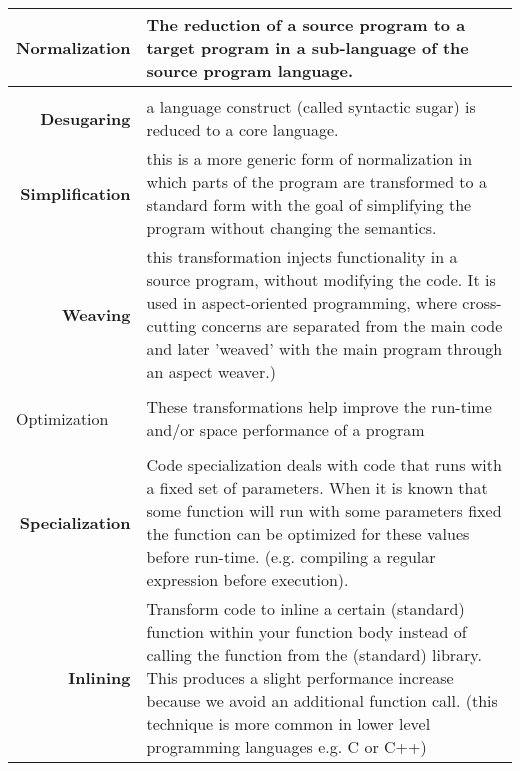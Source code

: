 \begin{longtable}{p{}p{}}
\multicolumn{1}{l}{Normalization} & The reduction of a source program to a target program in a sub-language of the source program language.
\\ \hline \\
\multicolumn{1}{r}{\bf Desugaring}                  & a language construct (called syntactic sugar) is reduced to a core language.                                                    \\
\multicolumn{1}{r}{\bf Simplification}              & this is a more generic form of normalization in which parts of the program are transformed to a standard form with the goal of simplifying the program without changing the semantics. \\
\multicolumn{1}{r}{\bf Weaving}                     & this transformation injects functionality in a source program, without modifying the code. It is used in aspect-oriented programming, where cross-cutting concerns are separated from the main code and later 'weaved' with the main program through an aspect weaver.)                                                                                                                                                                               \\
\\
\multicolumn{1}{l}{Optimization}  & These transformations help improve the run-time and/or space performance of a program                                                                                         \\ \hline \\
\multicolumn{1}{r}{\bf Specialization}              & Code specialization deals with code that runs with a fixed set of parameters. When it is known that some function will run with some parameters fixed the function can be optimized for these values before run-time. (e.g. compiling a regular expression before execution).                                                                                                                                                                               \\
\multicolumn{1}{r}{\bf Inlining}                    & Transform code to inline a certain (standard) function within your function body instead of calling the function from the (standard) library. This produces a slight performance increase because we avoid an additional function call. (this technique is more common in lower level programming languages e.g. C or C++)                                                                                                                                                                              \\

\end{longtable}
